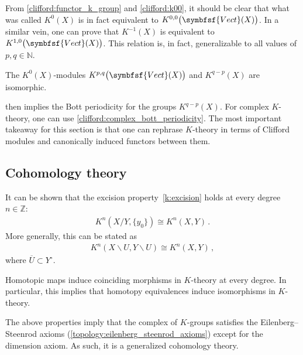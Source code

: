     From \cref{clifford:functor_k_group} and \cref{clifford:k00}, it should be clear that what was called $K^0(X)$ is in fact equivalent to $K^{0,0}\bigl(\symbfsf{Vect}(X)\bigr)$. In a similar vein, one can prove that $K^{-1}(X)$ is equivalent to $K^{1,0}\bigl(\symbfsf{Vect}(X)\bigr)$. This relation is, in fact, generalizable to all values of $p,q\in\mathbb{N}$.
    \begin{property}
        The $K^0(X)$-modules $K^{p,q}\bigl(\symbfsf{Vect}(X)\bigr)$ and $K^{q-p}(X)$ are isomorphic.
    \end{property}

     then implies the Bott periodicity for the groups $K^{q-p}(X)$. For complex $K$-theory, one can use \cref{clifford:complex_bott_periodicity}. The most important takeaway for this section is that one can rephrase $K$-theory in terms of Clifford modules and canonically induced functors between them.

\subsection{Cohomology theory}

    \begin{property}[Excision]
        It can be shown that the excision property~\ref{k:excision} holds at every degree $n\in\mathbb{Z}$:
        \begin{gather}
            K^n(X/Y,\{y_0\})\cong K^n(X,Y)\,.
        \end{gather}
        More generally, this can be stated as
        \begin{gather}
            K^n(X\backslash U,Y\backslash U)\cong K^n(X,Y)\,,
        \end{gather}
        where $\overline{U}\subset Y^\circ$.
    \end{property}
    \begin{property}
        Homotopic maps induce coinciding morphisms in $K$-theory at every degree. In particular, this implies that homotopy equivalences induce isomorphisms in $K$-theory.
    \end{property}

    \begin{remark}
        The above properties imply that the complex of $K$-groups satisfies the Eilenberg--Steenrod axioms (\cref{topology:eilenberg_steenrod_axioms}) except for the dimension axiom. As such, it is a generalized cohomology theory.
    \end{remark}

